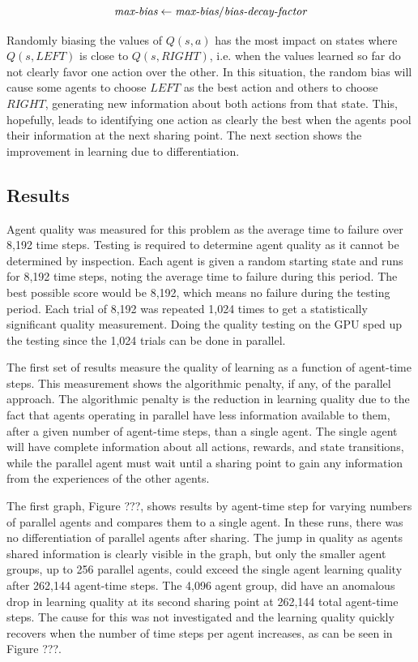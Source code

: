 \documentclass[11pt]{article} %
\begin{document}
\begin{flushleft}
\begin{equation}
\mbox{\it max-bias} \gets \mbox{\it max-bias} / \mbox{\it bias-decay-factor}
\end{equation}

Randomly biasing the values of $Q(s,a)$ has the most impact on states where $Q(s,LEFT)$ is close to $Q(s,RIGHT)$, i.e. when the values learned so far do not clearly favor one action over the other.  In this situation, the random bias will cause some agents to choose $LEFT$ as the best action and others to choose $RIGHT$, generating new information about both actions from that state.  This, hopefully, leads to identifying one action as clearly the best when the agents pool their information at the next sharing point.  The next section shows the improvement in learning due to differentiation.

\subsection{Results}
Agent quality was measured for this problem as the average time to failure over 8,192 time steps.  Testing is required to determine agent quality as it cannot be determined by inspection.  Each agent is given a random starting state and runs for 8,192 time steps, noting the average time to failure during this period.  The best possible score would be 8,192, which means no failure during the testing period.  Each trial of 8,192 was repeated 1,024 times to get a statistically significant quality measurement.  Doing the quality testing on the GPU sped up the testing since the 1,024 trials can be done in parallel.

The first set of results measure the quality of learning as a function of agent-time steps.  This measurement shows the algorithmic penalty, if any, of the parallel approach.  The algorithmic penalty is the reduction in learning quality due to the fact that agents operating in parallel have less information available to them, after a given number of agent-time steps, than a single agent.  The single agent will have complete information about all actions, rewards, and state transitions, while the parallel agent must wait until a sharing point to gain any information from the experiences of the other agents.

The first graph, Figure ???, shows results by agent-time step for varying numbers of parallel agents and compares them to a single agent.  In these runs, there was no differentiation of parallel agents after sharing.  The jump in quality as agents shared information is clearly visible in the graph, but only the smaller agent groups, up to 256 parallel agents, could exceed the single agent learning quality after 262,144 agent-time steps.  The 4,096 agent group, did have an anomalous drop in learning quality at its second sharing point at 262,144 total agent-time steps.  The cause for this was not investigated and the learning quality quickly recovers when the number of time steps per agent increases, as can be seen in Figure ???.

\end{flushleft}
\end{document}
